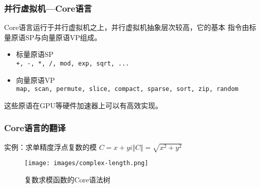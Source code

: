 \documentclass{beamer}
\begin{document}
\begin{frame}
  \frametitle{并行虚拟机---Core语言}
  Core语言运行于并行虚拟机之上，并行虚拟机抽象层次较高，它的基本
  指令由标量原语SP与向量原语VP组成。
  \begin{itemize}
    \item 标量原语SP\\
      \texttt{+, -, *, /, mod, exp, sqrt, ...}
    \item 向量原语VP\\
      \texttt{map, scan, permute, slice, compact, sparse, sort, zip, random}
  \end{itemize}
  这些原语在GPU等硬件加速器上可以有高效实现。
\end{frame}

\begin{frame}
  \frametitle{Core语言的翻译}
  \begin{block}{实例：求单精度浮点复数的模}
    $C=x+yi$\hspace{3cm}$\Vert C \Vert = \sqrt{x^2+y^2}$
    
  \end{block}
  \pause
  \begin{figure}
    \caption{复数求模函数的Core语法树}
    \texttt{[image: images/complex-length.png]}
  \end{figure}
\end{frame}
\end{document}
